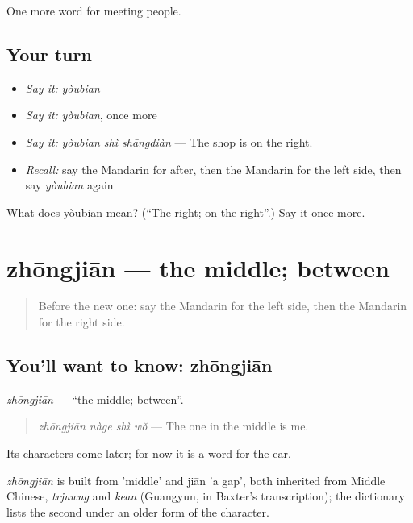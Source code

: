 \begin{grammarlens}[title={What you've built}]
One more word for meeting people.
\end{grammarlens}

\subsection*{Your turn}
\begin{itemize}
\raggedright
  \item \emph{Say it:} \emph{yòubian}
  \item \emph{Say it:} \emph{yòubian}, once more
  \item \emph{Say it:} \emph{yòubian shì shāngdiàn} — The shop is on the right.
  \item \emph{Recall:} say the Mandarin for after, then the Mandarin for the left side, then say \emph{yòubian} again
\end{itemize}

\begin{tcolorbox}[breakable,colback=teal!4,colframe=teal!35!black,title={Before you move on}]
What does yòubian mean? (\textquotedblleft{}The right; on the right\textquotedblright{}.) Say it once more.
\end{tcolorbox}
\section[zhōngjiān]{zhōngjiān — the middle; between}

\label{lesson:ZH-C82-zhongjian}



\begin{quote}
Before the new one: say the Mandarin for the left side, then the Mandarin for the right side.
\end{quote}

\subsection*{You'll want to know: zhōngjiān}
\emph{zhōngjiān} — \textquotedblleft{}the middle; between\textquotedblright{}.

\begin{quote}
\emph{zhōngjiān nàge shì wǒ} — The one in the middle is me.
\end{quote}

Its characters come later; for now it is a word for the ear.

\begin{cousinweb}
\emph{zhōngjiān} is built from  'middle' and jiān 'a gap', both inherited from Middle Chinese, \emph{trjuwng} and \emph{kean} (Guangyun, in Baxter's transcription); the dictionary lists the second under an older form of the character.
\end{cousinweb}


